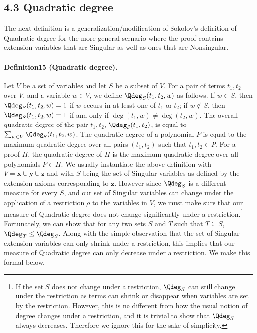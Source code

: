 \subsection*{4.3 Quadratic degree}
The next definition is a generalization/modification of Sokolov's definition of Quadratic degree for the more general scenario where the proof contains extension variables that are Singular as well as ones that are Nonsingular.
\paragraph{Definition15 (Quadratic degree).}
Let $V$ be a set of variables and let $S$ be a subset of $V$. For a pair of terms $t_1,t_2$ over $V$, and a variable $w\in V$, we define $\Qdeg_S(t_1,t_2,w)$ as follows. If $w\in S$, then $\Qdeg_S(t_1,t_2,w)=1$ if $w$ occurs in at least one of $t_1$ or $t_2$; if $w\notin S$, then $\Qdeg_S(t_1,t_2,w)=1$ if and only if $\deg(t_1,w)\neq\deg(t_2,w)$. The overall quadratic degree of the pair $t_1,t_2$, $\Qdeg_S(t_1,t_2)$, is equal to $\sum_{w\in V}\Qdeg_S(t_1,t_2,w)$. The quadratic degree of a polynomial $P$ is equal to the maximum quadratic degree over all pairs $(t_1,t_2)$ such that $t_1,t_2\in P$. For a proof $\Pi$, the quadratic degree of $\Pi$ is the maximum quadratic degree over all polynomials $P\in\Pi$.
We usually instantiate the above definition with $V=\mathbf x\cup\mathbf y\cup\mathbf z$ and with $S$ being the set of Singular variables as defined by the extension axioms corresponding to $\mathbf z$. However since $\Qdeg_S$ is a different measure for every $S$, and our set of Singular variables can change under the application of a restriction $\rho$ to the variables in $V$, we must make sure that our measure of Quadratic degree does not change significantly under a restriction.\footnote{If the set $S$ does not change under a restriction, $\Qdeg_S$ can still change under the restriction as terms can shrink or disappear when variables are set by the restriction. However, this is no different from how the usual notion of degree changes under a restriction, and it is trivial to show that $\Qdeg_S$ always decreases. Therefore we ignore this for the sake of simplicity.} Fortunately, we can show that for any two sets $S$ and $T$ such that $T\subseteq S$, $\Qdeg_T\leq\Qdeg_S$. Along with the simple observation that the set of Singular extension variables can only shrink under a restriction, this implies that our measure of Quadratic degree can only decrease under a restriction. We make this formal below.

